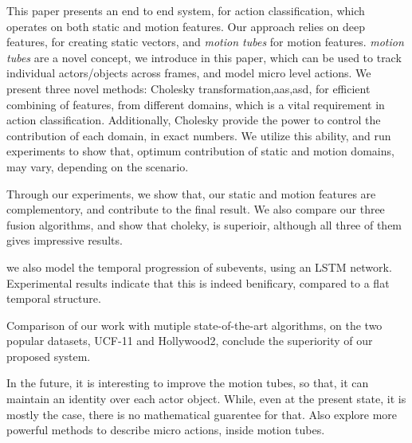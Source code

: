 This paper presents an end to end system, for action classification, which operates 
on both static and motion features. Our approach relies on deep features,
for creating static vectors, and \textit{motion tubes} for motion features. 
\textit{motion tubes} are a novel concept, we introduce in this paper, which can be
used to track individual actors/objects across frames, and model micro level actions. 
We present three novel methods: Cholesky transformation,aas,asd, for efficient combining of features, 
from different domains, which is a vital requirement in action classification. Additionally,
Cholesky provide the power to control the contribution of each domain, in exact numbers. 
We utilize this ability, and run experiments to show that, optimum contribution of 
static and motion domains, may vary, depending on the scenario. 

Through our experiments, we show that, our static and motion features are complementory,
and contribute to the final result. We also compare our three fusion algorithms, and 
show that choleky, is superioir, although all three of them gives impressive results. 


we also model the temporal progression of subevents, using an LSTM network. Experimental 
results indicate that this is indeed benificary, compared to a flat temporal structure. 

Comparison of our work with mutiple state-of-the-art algorithms, on the 
two popular datasets, UCF-11 and Hollywood2, conclude the superiority of our proposed system.

In the future, it is interesting to improve the motion tubes, so that, it can maintain an identity over each actor object.
While, even at the present state, it is mostly the case, there is no mathematical guarentee for that. 
Also explore more powerful methods to describe micro actions, inside motion tubes. 